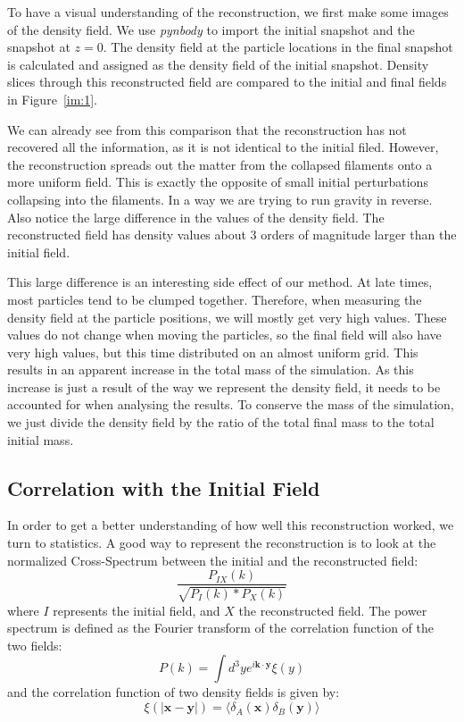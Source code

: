 To have a visual understanding of the reconstruction, we first make some images of the density field. We use \textit{pynbody} to import the initial snapshot and the snapshot at $z=0$. The density field at the particle locations in the final snapshot is calculated and assigned as the density field of the initial snapshot. Density slices through this reconstructed field are compared to the initial and final fields in Figure~\ref{im:1}. 

We can already see from this comparison that the reconstruction has not recovered all the information, as it is not identical to the initial filed. However, the reconstruction spreads out the matter from the collapsed filaments onto a more uniform field. This is exactly the opposite of small initial perturbations collapsing into the filaments. In a way we are trying to run gravity in reverse. Also notice the large difference in the values of the density field. The reconstructed field has density values about 3 orders of magnitude larger than the initial field.


This large difference is an interesting side effect of our method. At late times, most particles tend to be clumped together. Therefore, when measuring the density field at the particle positions, we will mostly get very high values. These values do not change when moving the particles, so the final field will also have very high values, but this time distributed on an almost uniform grid. This results in an apparent increase in the total mass of the simulation. As this increase is just a result of the way we represent the density field, it needs to be accounted for when analysing the results. To conserve the mass of the simulation, we just divide the density field by the ratio of the total final mass to the total initial mass.

\subsection{Correlation with the Initial Field}

In order to get a better understanding of how well this reconstruction worked, we turn to statistics. A good way to represent the reconstruction is to look at the normalized Cross-Spectrum between the initial and the reconstructed field: $$ \frac{P_{IX}(k)}{\sqrt{P_I(k) * P_X(k)}} $$ where $I$ represents the initial field, and $X$ the reconstructed field. The power spectrum is defined as the Fourier transform of the correlation function of the two fields:
\begin{equation}
    P(k) = \int{d^3y e^{i\textbf{k} \cdot \textbf{y}} \xi(y)}
\end{equation} 
and the correlation function of two density fields is given by:
\begin{equation}
    \xi(|\textbf{x}-\textbf{y}|) = \langle \delta_A(\textbf{x})\delta_B(\textbf{y}) \rangle
\end{equation}

